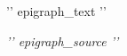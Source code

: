 \newpage

\vspace*{\fill}

\begin{center}
\epigraph{{ '{' }}{{ epigraph_text }}{{ '}' }}{\vspace*{.5em}\textit{{ '{' }}{{ epigraph_source }}{{ '}' }}}
\end{center}

\vspace*{2in}

\vspace*{\fill}
